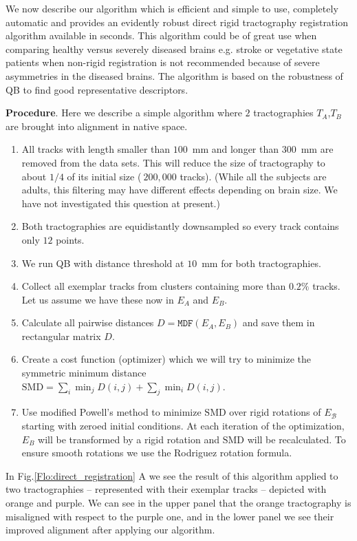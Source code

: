 \documentclass[preprint,authoryear,a4paper,10pt,onecolumn]{elsarticle}
\begin{document}
We now describe our algorithm which is efficient and simple
to use, completely automatic and provides an evidently robust direct
rigid tractography registration algorithm available in seconds. This
algorithm could be of great use when comparing healthy versus severely
diseased brains e.g. stroke or vegetative state patients when non-rigid
registration is not recommended because of severe asymmetries in the
diseased brains. The algorithm is based on the robustness of QB to find
good representative descriptors.

\textbf{Procedure}. Here we describe a simple algorithm where $2$
tractographies $T_{A}$,$T_{B}$ are brought into alignment in native
space.
\begin{enumerate}
\item All tracks with length smaller than $100$~mm and longer than $300$~mm
are removed from the data sets. This will reduce the size of tractography
to about $1/4$ of its initial size ($~200,000$ tracks). (While all
the subjects are adults, this filtering may have different effects
depending on brain size. We have not investigated this question at
present.)
\item Both tractographies are equidistantly downsampled so every track contains
only $12$ points. 
\item We run QB with distance threshold at $10$~mm for both tractographies.
\item Collect all exemplar tracks from clusters containing more than $0.2\%$
tracks. Let us assume we have these now in $E_{A}$ and $E_{B}$.
\item Calculate all pairwise distances $D=\mathtt{MDF}(E_{A},E_{B})$ and
save them in rectangular matrix $D$. 
\item Create a cost function (optimizer) which we will try to minimize the
symmetric minimum distance $\mathrm{SMD}=\sum_{i}\min_{j}D(i,j)+\sum_{j}\min_{i}D(i,j).$
\item Use modified Powell's method \citep{fletcher1987practical} to minimize
$\mathrm{SMD}$ over rigid rotations of $E_{\mathcal{B}}$ starting
with zeroed initial conditions. At each iteration of the optimization,
$E_{B}$ will be transformed by a rigid rotation and $\mathrm{SMD}$
will be recalculated. To ensure smooth rotations we use the Rodriguez
rotation formula.
\end{enumerate}

In Fig.\ref{Flo:direct_registration} A we see the result of this
algorithm applied to two tractographies -- represented with their
exemplar tracks -- depicted with orange and purple. We can see in the
upper panel that the orange tractography is misaligned with respect to
the purple one, and in the lower panel we see their improved alignment
after applying our algorithm.
\end{document}
